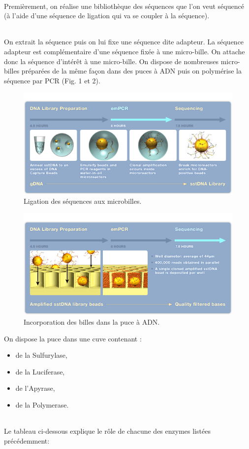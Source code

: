 ~~\\
Premièrement, on réalise une bibliothèque des séquences que l'on veut séquencé (à l'aide d'une séquence de ligation qui va se coupler à la séquence).

~~\\
On extrait la séquence puis on lui fixe une séquence dite adapteur. La séquence adapteur est complémentaire d'une séquence fixée à une micro-bille. On attache donc la séquence d’intérêt à une micro-bille. On dispose de nombreuses micro-billes préparées de la même façon dans des puces à ADN puis on polymérise la séquence par PCR (Fig. 1 et 2).
\newpage
\begin{figure}[!h]
 \centering
\includegraphics[scale=0.8]{Images/microbille.png}
\caption{Ligation des séquences aux microbilles.}
\end{figure}

\begin{figure}[!h]
 \centering
\includegraphics[scale=0.8]{Images/incbil.png}
\caption{Incorporation des billes dans la puce à ADN.}
\end{figure}

On dispose la puce dans une cuve contenant :
~~\\
\begin{itemize}
\item de la Sulfurylase,
\item de la Luciferase,
\item de l'Apyrase,
\item de la Polymerase.
\end{itemize}
~~\\
Le tableau ci-dessous explique le rôle de chacune des enzymes listées précédemment:
~~\\

